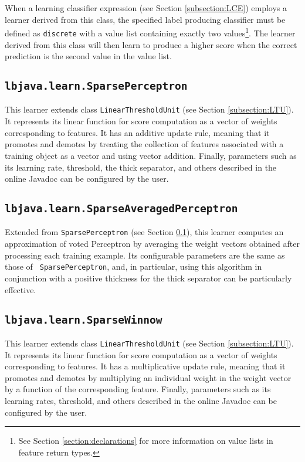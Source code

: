 When a learning classifier expression (see Section \ref{subsection:LCE})
employs a learner derived from this class, the specified label producing
classifier must be defined as {\tt discrete} with a value list containing
exactly two values\footnote{See Section \ref{section:declarations} for more
information on value lists in feature return types.}.  The learner derived
from this class will then learn to produce a higher score when the correct
prediction is the second value in the value list.

\subsection{{\tt lbjava.learn.SparsePerceptron}} \label{subsection:perceptron}
This learner extends class {\tt LinearThresholdUnit} (see Section
\ref{subsection:LTU}).  It represents its linear function for score
computation as a vector of weights corresponding to features.  It has an
additive update rule, meaning that it promotes and demotes by treating the
collection of features associated with a training object as a vector and using
vector addition.  Finally, parameters such as its learning rate, threshold,
the thick separator, and others described in the online Javadoc can be
configured by the user.

\subsection{{\tt lbjava.learn.SparseAveragedPerceptron}}
Extended from {\tt SparsePerceptron} (see Section
\ref{subsection:perceptron}), this learner computes an approximation of voted
Perceptron by averaging the weight vectors obtained after processing each
training example.  Its configurable parameters are the same as those of {\tt
SparsePerceptron}, and, in particular, using this algorithm in conjunction
with a positive thickness for the thick separator can be particularly
effective.

\subsection{{\tt lbjava.learn.SparseWinnow}}
This learner extends class {\tt LinearThresholdUnit} (see Section
\ref{subsection:LTU}).  It represents its linear function for score
computation as a vector of weights corresponding to features.  It has a
multiplicative update rule, meaning that it promotes and demotes by
multiplying an individual weight in the weight vector by a function of the
corresponding feature.  Finally, parameters such as its learning rates,
threshold, and others described in the online Javadoc can be configured by the
user.

